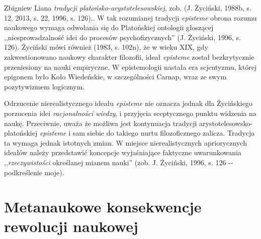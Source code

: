 \begin{artplenv}{Zbigniew Liana}
{	\textit{tradycji platońsko-arystotelesowskiej}, zob. \label{ref:RND3PMPQPUS6i}(J. Życiński, 1988b, s. 12, 2013, s. 22,
	1996, s. 126).}. W tak rozumianej tradycji \textit{episteme} obrona rozumu naukowego wymaga odwołania się do Platońskiej
ontologii głoszącej ,,niesprowadzalność idei do procesów psychofizycznych'' \label{ref:RNDhHlzendpnr}(J. Życiński, 1996,
s. 126). Życiński mówi również \label{ref:RNDynpLuVGokl}(1983, s. 102n), że w wieku XIX, gdy zakwestionowano naukowy
charakter filozofii, ideał \textit{episteme} został bezkrytycznie przeniesiony na nauki empiryczne. W epistemologii
nastała era scjentyzmu, której epigonem było Koło Wiedeńskie, w szczególności Carnap, wraz ze swym pozytywizmem
logicznym.

Odrzucenie nierealistycznego ideału \textit{episteme} nie oznacza jednak dla Życińskiego porzucenia idei
\textit{racjonalności wiedzy}, i przyjęcia sceptycznego punktu widzenia na naukę. Przeciwnie, uważa że możliwa jest
kontynuacja tradycji arystotelesowsko-platońskiej \textit{episteme} i sam siebie do takiego nurtu filozoficznego zalicza.
Tradycja ta wymaga jednak istotnych zmian. W miejsce nierealistycznych apriorycznych ideałów należy przedstawić
koncepcje wyjaśniające faktyczne uwarunkowania ,,\textit{rzeczywistości} określanej mianem nauki''
\label{ref:RNDDRndo6NuDC}(zob. J. Życiński, 1996, s. 126 -{}- podkreślenie moje).

\section{Metanaukowe konsekwencje rewolucji naukowej}


\end{artplenv}

